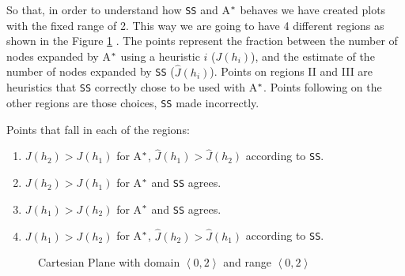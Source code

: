 So that, in order to understand how \texttt{SS} and A$\sp{*}$ behaves we have created plots with the fixed range of 2. This way we are going to have 4 different regions as shown in the Figure \ref{fig:img_cartesian_plane} . The points represent the fraction between the  number of nodes expanded by A$\sp{*}$ using a heuristic $i$ ($J(h_{i})$), and the estimate of the number of nodes expanded by \texttt{SS} ($\hat{J}(h_{i})$). Points on regions II and III are heuristics that \texttt{SS} correctly chose to be used with A$\sp{*}$. Points following on the other regions are those choices, \texttt{SS} made incorrectly.

Points that fall in each of the regions:
\begin{enumerate}[label=\Roman*]
\item $J(h_{2}) > J(h_{1})$ for A$\sp{*}$, $\hat{J}(h_{1}) > \hat{J}(h_{2})$ according to \texttt{SS}. 
\item $J(h_{2}) > J(h_{1})$ for A$\sp{*}$ and \texttt{SS} agrees.
\item $J(h_{1}) > J(h_{2})$ for A$\sp{*}$ and \texttt{SS} agrees.
\item $J(h_{1}) > J(h_{2})$ for A$\sp{*}$, $\hat{J}(h_{2}) > \hat{J}(h_{1})$ according to \texttt{SS}.
\end{enumerate}

\pagestyle{empty}

\begin{figure}[!htb]
\centering  
{}
  \caption{Cartesian Plane with domain $\left\langle 0, 2\right\rangle$ and range $\left\langle 0, 2\right\rangle$ }\label{fig:img_cartesian_plane}
\end{figure}

